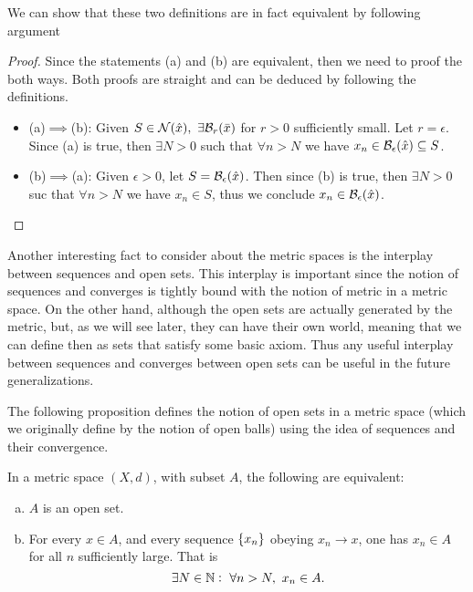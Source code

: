 We can show that these two definitions are in fact equivalent by following argument
\begin{proof}
	Since the statements (a) and (b) are equivalent, then we need to proof the both ways. Both proofs are straight and can be deduced by following the definitions.
	\begin{itemize}
		\item (a)$\implies$(b): Given $S\in \mathcal{N}(\hat{x}),\ \exists \mathcal{B}_{r}(\bar{x})$ for $r>0$ sufficiently small. Let $r=\epsilon$. Since (a) is true, then $\exists N>0$ such that $\forall n>N$ we have $x_n \in \mathcal{B}_{\epsilon}(\hat{x}) \subseteq S$.
		\item (b)$\implies$(a): Given $\epsilon>0$, let $S = \mathcal{B}_{\epsilon}(\hat{x})$. Then since (b) is true, then $\exists N>0$ suc that $\forall n>N$ we have $x_n \in S$, thus we conclude $x_n \in \mathcal{B}_{\epsilon}(\hat{x})$. 
	\end{itemize}
\end{proof}


Another interesting fact to consider about the metric spaces is the interplay between sequences and open sets. This interplay is important since the notion of sequences and converges is tightly bound with the notion of metric in a metric space. On the other hand, although the open sets are actually generated by the metric, but, as we will see later, they can have their own world, meaning that we can define then as sets that satisfy some basic axiom. Thus any useful interplay between sequences and converges between open sets can be useful in the future generalizations.

The following proposition defines the notion of open sets in a metric space (which we originally define by the notion of open balls) using the idea of sequences and their convergence. 

\begin{propbox}
	In a metric space $(X,d)$, with subset $A$, the following are equivalent:
	\begin{enumerate}[(a)]
		\item $A$ is an open set.
		\item For every $x\in A$, and every sequence $\{x_n\}$ obeying $x_n\to x$, one has $x_n\in A$ for all $n$ sufficiently large. That is 
		\[ \exists N \in \mathbb{N}:\ \forall n>N,\ x_n \in A. \]
	\end{enumerate}
\end{propbox}


